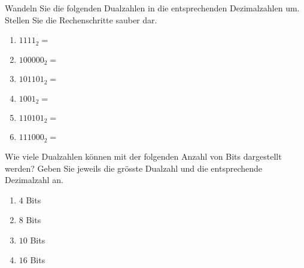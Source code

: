 \begin{exercise}
Wandeln Sie die folgenden Dualzahlen in die entsprechenden Dezimalzahlen um. Stellen Sie die Rechenschritte sauber dar.

\begin{multicols}{2}
\begin{enumerate}

\item $1111_2= $ \\
\begin{minipage}{\linewidth}
\centering
\fillwithgrid{1in}
\end{minipage}

\item $100000_2= $ \\
\begin{minipage}{\linewidth}
\centering
\fillwithgrid{1in}
\end{minipage}

\item $101101_2= $ \\
\begin{minipage}{\linewidth}
\centering
\fillwithgrid{1in}
\end{minipage}

\item $1001_2= $ \\
\begin{minipage}{\linewidth}
\centering
\fillwithgrid{1in}
\end{minipage}

\item $110101_2= $ \\
\begin{minipage}{\linewidth}
\centering
\fillwithgrid{1in}
\end{minipage}

\item $111000_2= $ \\
\begin{minipage}{\linewidth}
\centering
\fillwithgrid{1in}
\end{minipage}

\end{enumerate}
\end{multicols}
\end{exercise}

\begin{exercise}
Wie viele Dualzahlen können mit der folgenden Anzahl von Bits dargestellt werden? Geben Sie jeweils die grösste Dualzahl und die entsprechende Dezimalzahl an.

\begin{enumerate}
\item $4$ Bits
\fillwithgrid{0.25in}
\item $8$ Bits
\fillwithgrid{0.25in}
\item $10$ Bits
\fillwithgrid{0.25in}
\item $16$ Bits
\fillwithgrid{0.25in}
\end{enumerate}
\end{exercise}

